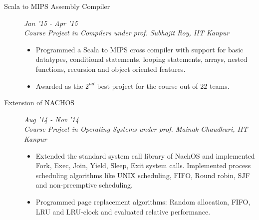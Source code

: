 \documentclass[9pt]{article}
\newenvironment{changemargin}[2]{%
  \begin{list}{}{%
      \setlength{\topsep}{0pt}%
    \setlength{\leftmargin}{#1}%
    \setlength{\rightmargin}{#2}%
    \setlength{\listparindent}{\parindent}%
  \setlength{\itemindent}{\parindent}%
    \setlength{\parsep}{\parskip}%
    }%
  \item[]}{\end{list}
    }
\newenvironment{body} {
  \vspace*{-16pt}
        \begin{changemargin}{-0.6in}{-0.65in}
        }	
        {\end{changemargin}
}
\begin{document}
\begin{body}
\begin{description}
\newpage
  \item[\normalsize{Scala to MIPS Assembly Compiler}] \hfill \textit{Jan '15 - Apr '15} \\
    \textit{Course Project in Compilers under prof. Subhajit Roy, IIT Kanpur}
  \begin{itemize}
    \item Programmed a Scala to MIPS cross compiler with support for basic 
      datatypes, conditional statements,
      looping statements, arrays, nested functions, recursion and object oriented 
      features.
    \item Awarded as the $2^{nd}$ best project for the course out of 22 teams.
  \end{itemize}

\item[\normalsize{Extension of NACHOS}]  \hfill \textit{Aug '14 - Nov '14} \\
  \textit{Course Project in Operating Systems under prof. Mainak Chaudhuri, IIT Kanpur}
  \begin{itemize}
    \item Extended the standard system call library of NachOS and implemented 
      Fork, Exec, Join, Yield, Sleep, Exit system calls. Implemented process 
      scheduling algorithms like UNIX scheduling, FIFO, Round robin, SJF and non-preemptive scheduling.
    \item Programmed page replacement algorithms: Random allocation, FIFO, LRU 
      and LRU-clock and evaluated relative performance.
  \end{itemize}

  \end{description}
  \smallskip
\end{body}
\end{document}
